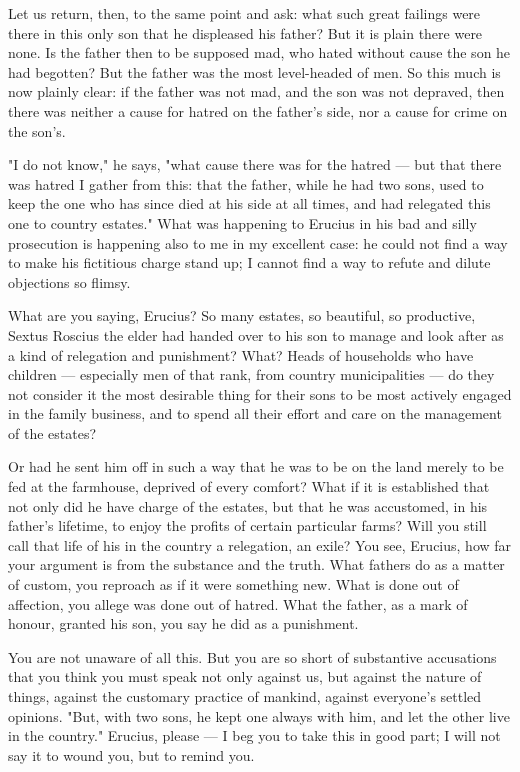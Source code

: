  Let us return, then, to the same point and ask: what such great failings were there in this only son that he displeased his father? But it is plain there were none. Is the father then to be supposed mad, who hated without cause the son he had begotten? But the father was the most level-headed of men. So this much is now plainly clear: if the father was not mad, and the son was not depraved, then there was neither a cause for hatred on the father's side, nor a cause for crime on the son's.

 "I do not know," he says, "what cause there was for the hatred --- but that there was hatred I gather from this: that the father, while he had two sons, used to keep the one who has since died at his side at all times, and had relegated this one to country estates." What was happening to Erucius in his bad and silly prosecution is happening also to me in my excellent case: he could not find a way to make his fictitious charge stand up; I cannot find a way to refute and dilute objections so flimsy.

 What are you saying, Erucius? So many estates, so beautiful, so productive, Sextus Roscius the elder had handed over to his son to manage and look after as a kind of relegation and punishment? What? Heads of households who have children --- especially men of that rank, from country municipalities --- do they not consider it the most desirable thing for their sons to be most actively engaged in the family business, and to spend all their effort and care on the management of the estates?

 Or had he sent him off in such a way that he was to be on the land merely to be fed at the farmhouse, deprived of every comfort? What if it is established that not only did he have charge of the estates, but that he was accustomed, in his father's lifetime, to enjoy the profits of certain particular farms? Will you still call that life of his in the country a relegation, an exile? You see, Erucius, how far your argument is from the substance and the truth. What fathers do as a matter of custom, you reproach as if it were something new. What is done out of affection, you allege was done out of hatred. What the father, as a mark of honour, granted his son, you say he did as a punishment.

 You are not unaware of all this. But you are so short of substantive accusations that you think you must speak not only against us, but against the nature of things, against the customary practice of mankind, against everyone's settled opinions. "But, with two sons, he kept one always with him, and let the other live in the country." Erucius, please --- I beg you to take this in good part; I will not say it to wound you, but to remind you.

